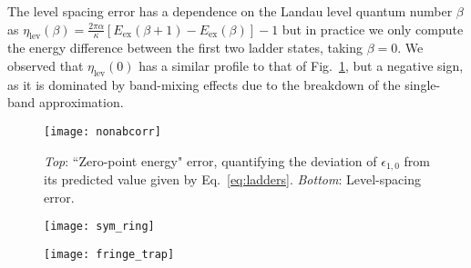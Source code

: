 \documentclass[twocolumn, 10pt, aps, superscriptaddress, floatfix, showpacs, pra, citeautoscript]{revtex4-1}
\newcommand{\co}[2]{#2}
\renewcommand{\paragraph}{\co}
\begin{document}

\paragraph{The level spacing error is dominated by band-mixing effects. }
The level spacing error has a dependence on the Landau level quantum
number $\beta$ as
$\eta_{\text{lev}}(\beta) = \frac{2\pi \alpha}{\kappa} [E_{\text{ex}}(\beta+1) -
E_{\text{ex}}(\beta)] -1$
but in practice we only compute the energy difference between the
first two ladder states, taking $\beta = 0$. We observed that
$\eta_{\text{lev}}(0)$ has a similar profile to that of
Fig.~\ref{fig:zpe}, but a negative sign, as it is dominated by
band-mixing effects due to the breakdown of the single-band
approximation.


\begin{figure}[htb]\centering
  \texttt{[image: nonabcorr]} %
  \caption{\emph{Top}: ``Zero-point energy" error, quantifying the deviation of
    $\epsilon_{1,0}$ from its predicted value given by Eq.~\eqref{eq:ladders}.
    \emph{Bottom}: Level-spacing error.}
  \label{fig:zpe}
\end{figure}

\begin{figure}[htb]
  \centering
  \texttt{[image: sym\_ring]} %
  \caption{}
  \label{fig:torus_edge}
\end{figure}

\begin{figure}[htb]
  \centering
  \texttt{[image: fringe\_trap]} %
  \caption{}
  \label{fig:moving_trap}
\end{figure}
\end{document}
